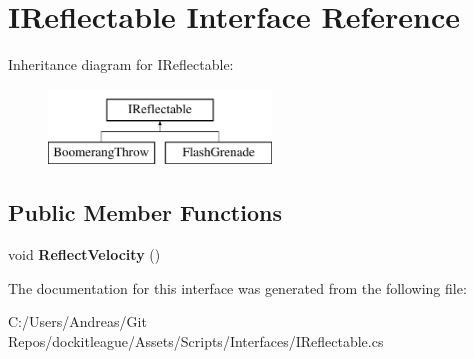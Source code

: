 \hypertarget{interface_i_reflectable}{}\section{I\+Reflectable Interface Reference}
\label{interface_i_reflectable}
Inheritance diagram for I\+Reflectable\+:\begin{figure}[H]
\begin{center}
\leavevmode
\includegraphics[height=2.000000cm]{interface_i_reflectable}
\end{center}
\end{figure}
\subsection*{Public Member Functions}
\begin{DoxyCompactItemize}
\item 
\hypertarget{interface_i_reflectable_a5b4dc43cf2da4145468da71e6527bd4b}{}\label{interface_i_reflectable_a5b4dc43cf2da4145468da71e6527bd4b} 
void {\bfseries Reflect\+Velocity} ()
\end{DoxyCompactItemize}


The documentation for this interface was generated from the following file\+:\begin{DoxyCompactItemize}
\item 
C\+:/\+Users/\+Andreas/\+Git Repos/dockitleague/\+Assets/\+Scripts/\+Interfaces/I\+Reflectable.\+cs\end{DoxyCompactItemize}
